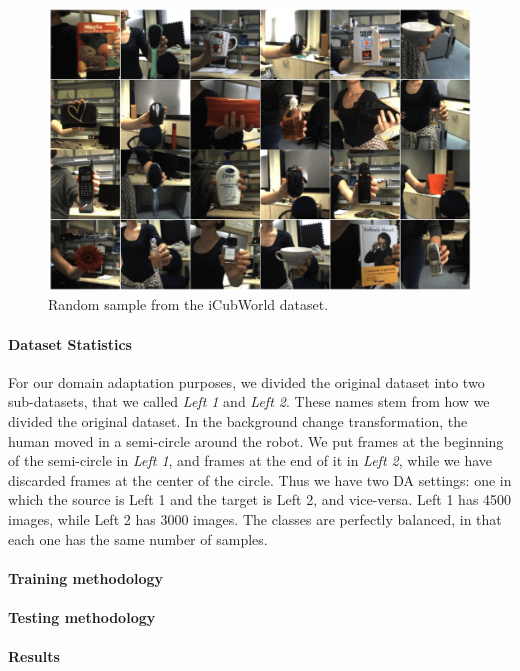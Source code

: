 \documentclass[../main.tex]{subfiles}
\begin{document}
    \begin{figure}[h!]
        \centering{}
        \includegraphics[width=\linewidth]{./img/icw-samples.png}
        \caption{Random sample from the iCubWorld dataset.}\label{fig:icw-samples}
    \end{figure}

    \paragraph{Dataset Statistics}
    For our domain adaptation purposes, we divided the original dataset into two sub-datasets, that we called \textit{Left 1} and
    \textit{Left 2}. These names stem from how we divided the original dataset. In the background change transformation, the human
    moved in a semi-circle around the robot. We put frames at the beginning of the semi-circle in \textit{Left 1}, and frames at the
    end of it in \textit{Left 2}, while we have discarded frames at the center of the circle. Thus we have two DA settings: one in which
    the source is Left 1 and the target is Left 2, and vice-versa. Left 1 has 4500 images, while Left 2 has 3000 images. The classes
    are perfectly balanced, in that each one has the same number of samples.

    \paragraph{Training methodology}
    \paragraph{Testing methodology}
    \paragraph{Results}
\end{document}
